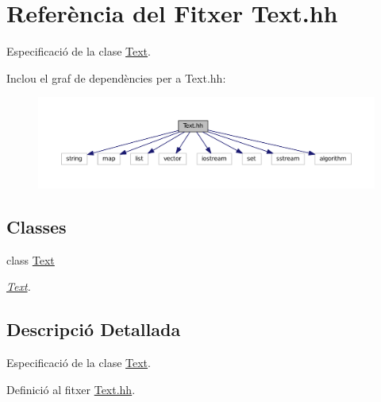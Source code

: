 \hypertarget{_text_8hh}{\section{Referència del Fitxer Text.\+hh}
\label{_text_8hh}
}


Especificació de la clase \hyperlink{class_text}{Text}.  


Inclou el graf de dependències per a Text.\+hh\+:\nopagebreak
\begin{figure}[H]
\begin{center}
\leavevmode
\includegraphics[width=350pt]{_text_8hh__incl}
\end{center}
\end{figure}
\subsection*{Classes}
\begin{DoxyCompactItemize}
\item 
class \hyperlink{class_text}{Text}
\begin{DoxyCompactList}\small\item\em \hyperlink{class_text}{Text}. \end{DoxyCompactList}\end{DoxyCompactItemize}


\subsection{Descripció Detallada}
Especificació de la clase \hyperlink{class_text}{Text}. 



Definició al fitxer \hyperlink{_text_8hh_source}{Text.\+hh}.

